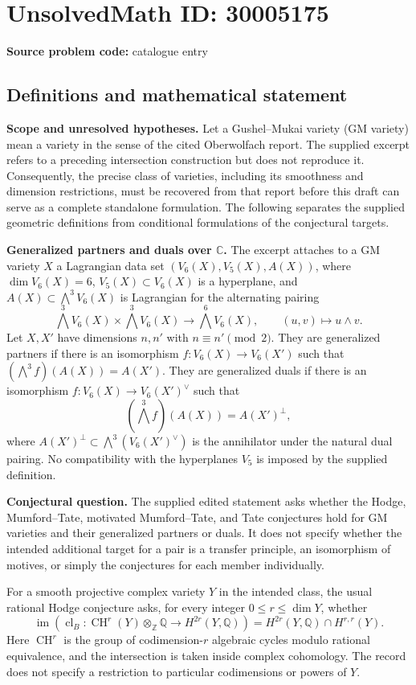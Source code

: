 \documentclass[11pt]{article}
\newcommand{\Z}{\mathbb{Z}}
\newcommand{\Q}{\mathbb{Q}}
\newcommand{\C}{\mathbb{C}}
\begin{document}
\section*{UnsolvedMath ID: 30005175}
\textbf{Source problem code:} catalogue entry
\subsection{Definitions and mathematical statement}
\textbf{Scope and unresolved hypotheses.} Let a Gushel--Mukai variety (GM variety) mean a variety in the sense of the cited Oberwolfach report. The supplied excerpt refers to a preceding intersection construction but does not reproduce it. Consequently, the precise class of varieties, including its smoothness and dimension restrictions, must be recovered from that report before this draft can serve as a complete standalone formulation. The following separates the supplied geometric definitions from conditional formulations of the conjectural targets.

\textbf{Generalized partners and duals over \(\C\).} The excerpt attaches to a GM variety \(X\) a Lagrangian data set \((V_6(X),V_5(X),A(X))\), where \(\dim V_6(X)=6\), \(V_5(X)\subset V_6(X)\) is a hyperplane, and \(A(X)\subset\bigwedge^3V_6(X)\) is Lagrangian for the alternating pairing
\[
\bigwedge^3V_6(X)\times\bigwedge^3V_6(X)\longrightarrow\bigwedge^6V_6(X),\qquad (u,v)\longmapsto u\wedge v.
\]
Let \(X,X'\) have dimensions \(n,n'\) with \(n\equiv n'\pmod 2\). They are generalized partners if there is an isomorphism \(f:V_6(X)\to V_6(X')\) such that \((\bigwedge^3f)(A(X))=A(X')\). They are generalized duals if there is an isomorphism \(f:V_6(X)\to V_6(X')^\vee\) such that
\[
(\bigwedge^3f)(A(X))=A(X')^\perp,
\]
where \(A(X')^\perp\subset\bigwedge^3(V_6(X')^\vee)\) is the annihilator under the natural dual pairing. No compatibility with the hyperplanes \(V_5\) is imposed by the supplied definition.

\textbf{Conjectural question.} The supplied edited statement asks whether the Hodge, Mumford--Tate, motivated Mumford--Tate, and Tate conjectures hold for GM varieties and their generalized partners or duals. It does not specify whether the intended additional target for a pair is a transfer principle, an isomorphism of motives, or simply the conjectures for each member individually.

For a smooth projective complex variety \(Y\) in the intended class, the usual rational Hodge conjecture asks, for every integer \(0\leq r\leq\dim Y\), whether
\[
\operatorname{im}\!\left(\operatorname{cl}_B:\operatorname{CH}^r(Y)\otimes_{\Z}\Q\longrightarrow H^{2r}(Y,\Q)\right)
=H^{2r}(Y,\Q)\cap H^{r,r}(Y).
\]
Here \(\operatorname{CH}^r\) is the group of codimension-\(r\) algebraic cycles modulo rational equivalence, and the intersection is taken inside complex cohomology. The record does not specify a restriction to particular codimensions or powers of \(Y\).
\end{document}
